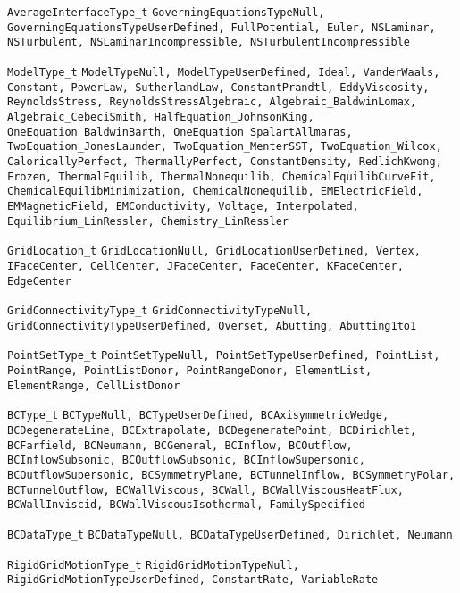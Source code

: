 {\begin{Ventryi}{\texttt{AverageInterfaceType\_t}}
         \texttt{GoverningEquationsTypeNull, GoverningEquationsTypeUserDefined, FullPotential, Euler, NSLaminar,
         NSTurbulent, NSLaminarIncompressible,
         NSTurbulentIncompressible}
   \item [\texttt{ModelType\_t}]
         \texttt{ModelTypeNull, ModelTypeUserDefined, Ideal, VanderWaals, Constant,
         PowerLaw, SutherlandLaw, ConstantPrandtl, EddyViscosity,
         ReynoldsStress, ReynoldsStressAlgebraic,
         Algebraic\_BaldwinLomax, Algebraic\_CebeciSmith,
         HalfEquation\_JohnsonKing, OneEquation\_BaldwinBarth,
         OneEquation\_SpalartAllmaras, TwoEquation\_JonesLaunder,
         TwoEquation\_MenterSST, TwoEquation\_Wilcox,
	 CaloricallyPerfect, ThermallyPerfect,
	 ConstantDensity, RedlichKwong,
	 Frozen, ThermalEquilib, ThermalNonequilib,
	 ChemicalEquilibCurveFit, ChemicalEquilibMinimization,
	 ChemicalNonequilib, EMElectricField, EMMagneticField,
         EMConductivity, Voltage, Interpolated,
         Equilibrium\_LinRessler, Chemistry\_LinRessler}
   \item [\texttt{GridLocation\_t}]
         \texttt{GridLocationNull, GridLocationUserDefined, Vertex, IFaceCenter, CellCenter, JFaceCenter,
         FaceCenter, KFaceCenter, EdgeCenter}
   \item [\texttt{GridConnectivityType\_t}]
         \texttt{GridConnectivityTypeNull, GridConnectivityTypeUserDefined, Overset, Abutting, Abutting1to1}
   \item [\texttt{PointSetType\_t}]
         \texttt{PointSetTypeNull, PointSetTypeUserDefined, PointList, PointRange, PointListDonor, PointRangeDonor,
         ElementList, ElementRange, CellListDonor}
   \item [\texttt{BCType\_t}]
         \texttt{BCTypeNull, BCTypeUserDefined, BCAxisymmetricWedge,
         BCDegenerateLine, BCExtrapolate,
         BCDegeneratePoint, BCDirichlet, BCFarfield, BCNeumann,
         BCGeneral, BCInflow, BCOutflow, BCInflowSubsonic,
         BCOutflowSubsonic, BCInflowSupersonic,
         BCOutflowSupersonic, BCSymmetryPlane, BCTunnelInflow,
         BCSymmetryPolar, BCTunnelOutflow, BCWallViscous,
         BCWall, BCWallViscousHeatFlux, BCWallInviscid,
         BCWallViscousIsothermal, FamilySpecified}
   \item [\texttt{BCDataType\_t}]
         \texttt{BCDataTypeNull, BCDataTypeUserDefined, Dirichlet, Neumann}
   \item [\texttt{RigidGridMotionType\_t}]
         \texttt{RigidGridMotionTypeNull, RigidGridMotionTypeUserDefined, ConstantRate, VariableRate}

\end{Ventryi}}
